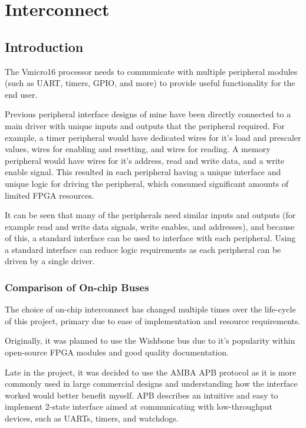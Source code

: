
\newpage
\chapter{Interconnect}
{%
\startcontents[chapters]
}


\section{Introduction}
The Vmicro16 processor needs to communicate with multiple peripheral modules (such as UART, timers, GPIO, and more) to provide useful functionality for the end user.

Previous peripheral interface designs of mine have been directly connected to a main driver with unique inputs and outputs that the peripheral required. For example, a timer peripheral would have dedicated wires for it's load and prescaler values, wires for enabling and resetting, and wires for reading. A memory peripheral would have wires for it's address, read and write data, and a write enable signal. This resulted in each peripheral having a unique interface and unique logic for driving the peripheral, which consumed significant amounts of limited FPGA resources.

It can be seen that many of the peripherals need similar inputs and outputs (for example read and write data signals, write enables, and addresses), and because of this, a standard interface can be used to interface with each peripheral. Using a standard interface can reduce logic requirements as each peripheral can be driven by a single driver.

\subsection{Comparison of On-chip Buses}
The choice of on-chip interconnect has changed multiple times over the life-cycle of this project, primary due to ease of implementation and resource requirements. 

Originally, it was planned to use the Wishbone bus \cite{wishbone} due to it's popularity within open-source FPGA modules and good quality documentation.

Late in the project, it was decided to use the AMBA APB protocol \cite {ambaapb} as it is more commonly used in large commercial designs and understanding how the interface worked would better benefit myself. APB describes an intuitive and easy to implement 2-state interface aimed at communicating with low-throughput devices, such as UARTs, timers, and watchdogs.


